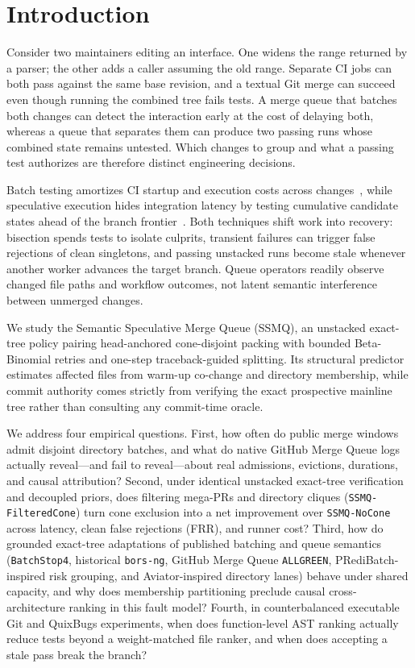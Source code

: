 \section{Introduction}
\label{sec:intro}
Consider two maintainers editing an interface. One widens the range returned by a parser; the other adds a caller assuming the old range. Separate CI jobs can both pass against the same base revision, and a textual Git merge can succeed even though running the combined tree fails tests. A merge queue that batches both changes can detect the interaction early at the cost of delaying both, whereas a queue that separates them can produce two passing runs whose combined state remains untested. Which changes to group and what a passing test authorizes are therefore distinct engineering decisions.

Batch testing amortizes CI startup and execution costs across changes~\cite{beheshtian2022software,fallahzadeh2023accelerating,fallahzadeh2025contrasting}, while speculative execution hides integration latency by testing cumulative candidate states ahead of the branch frontier~\cite{zuul2026gating,ananthanarayanan2019keeping}. Both techniques shift work into recovery: bisection spends tests to isolate culprits, transient failures can trigger false rejections of clean singletons, and passing unstacked runs become stale whenever another worker advances the target branch. Queue operators readily observe changed file paths and workflow outcomes, not latent semantic interference between unmerged changes.

We study the Semantic Speculative Merge Queue (SSMQ), an unstacked exact-tree policy pairing head-anchored cone-disjoint packing with bounded Beta-Binomial retries and one-step traceback-guided splitting. Its structural predictor estimates affected files from warm-up co-change and directory membership, while commit authority comes strictly from verifying the exact prospective mainline tree rather than consulting any commit-time oracle.

We address four empirical questions. First, how often do public merge windows admit disjoint directory batches, and what do native GitHub Merge Queue logs actually reveal---and fail to reveal---about real admissions, evictions, durations, and causal attribution? Second, under identical unstacked exact-tree verification and decoupled priors, does filtering mega-PRs and directory cliques (\texttt{SSMQ-FilteredCone}) turn cone exclusion into a net improvement over \texttt{SSMQ-NoCone} across latency, clean false rejections (FRR), and runner cost? Third, how do grounded exact-tree adaptations of published batching and queue semantics (\texttt{BatchStop4}, historical \texttt{bors-ng}, GitHub Merge Queue \texttt{ALLGREEN}, PRediBatch-inspired risk grouping, and Aviator-inspired directory lanes) behave under shared capacity, and why does membership partitioning preclude causal cross-architecture ranking in this fault model? Fourth, in counterbalanced executable Git and QuixBugs experiments, when does function-level AST ranking actually reduce tests beyond a weight-matched file ranker, and when does accepting a stale pass break the branch?

